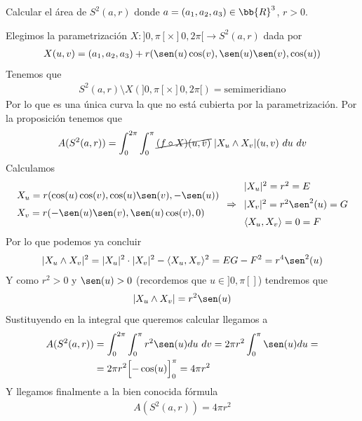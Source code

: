 \begin{ejemplo}
    Calcular el área de $S^2(a,r)$ donde $a=(a_1, a_2, a_3)\in \bb{R}^3$, $r>0$.\\
    \begin{solucion}
        Elegimos la parametrización $X:]0,\pi[\times]0,2\pi[ \to S^2(a,r)$ dada por
        \begin{gather*}
            X(u,v) = (a_1,a_2,a_3) + r(\sen(u)\cos(v), \sen(u)\sen(v), \cos(u))
        \end{gather*}
        Tenemos que 
        \begin{gather*}
            S^2(a,r) \setminus X(]0,\pi[\times]0,2\pi[) = \text{semimeridiano}
        \end{gather*}
        Por lo que es una única curva la que no está cubierta por la parametrización. Por la proposición tenemos que 
        \begin{gather*}
            A(S^2(a,r)) = \int_0^{2\pi} \int_0^{\pi} \cancel{(f\circ X)(u,v)}\ |X_u\wedge X_v|(u,v)\ du\ dv
        \end{gather*}
        Calculamos
        \begin{gather*}
            \begin{array}{l}
                X_u = r(\cos(u)\cos(v), \cos(u)\sen(v), -\sen(u))\\[0.6em]
                X_v = r(-\sen(u)\sen(v), \sen(u)\cos(v), 0)
            \end{array} \Rightarrow 
            \begin{array}{l}
                |X_u|^2 = r^2 = E\\[0.6em]
                |X_v|^2 = r^2\sen^2(u) = G\\[0.6em]
                \langle X_u, X_v \rangle = 0 = F
            \end{array}
        \end{gather*}
        Por lo que podemos ya concluir 
        \begin{gather*}
            |X_u\wedge X_v|^2 = |X_u|^2 \cdot |X_v|^2 - \langle X_u, X_v \rangle^2 = EG - F^2 = r^4\sen^2(u)
        \end{gather*}
        Y como $r^2>0$ y $\sen(u)>0$ (recordemos que $u\in]0,\pi[]$) tendremos que 
        \begin{gather*}
            |X_u\wedge X_v| = r^2 \sen(u)
        \end{gather*}
        Sustituyendo en la integral que queremos calcular llegamos a 
        \begin{align*}
            A(S^2(a,r)) &= 
            \int_0^{2\pi} \int_0^{\pi} r^2 \sen(u) du \ dv = 
            2\pi r^2 \int_0^{\pi} \sen(u) du = \\
            &=
            2\pi r^2 \Bigl[ -\cos(u)\Bigr]_0^{\pi} = 4\pi r^2
        \end{align*}
        Y llegamos finalmente a la bien conocida fórmula
        \begin{gather*}
            \boxed{A(S^2(a,r)) = 4\pi r^2}
        \end{gather*}
    \end{solucion}
\end{ejemplo}

